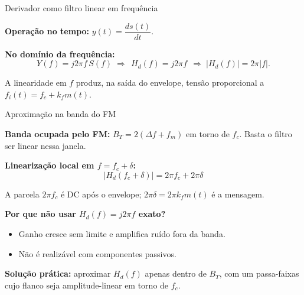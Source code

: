 
\begin{frame}{Derivador como filtro linear em frequência}

\small
\textbf{Operação no tempo:} $y(t) = \dfrac{ds(t)}{dt}$.

\pause
\textbf{No domínio da frequência:}
\[
Y(f) = j2\pi f\, S(f) \;\Longrightarrow\; \boxed{\,H_d(f) = j2\pi f\,} \;\Longrightarrow\; |H_d(f)| = 2\pi|f|.
\]

\pause
\begin{center}
\end{center}

A linearidade em $f$ produz, na saída do envelope, tensão proporcional a $f_i(t) = f_c + k_f m(t)$.

\end{frame}


\begin{frame}{Aproximação na banda do FM}

\textbf{Banda ocupada pelo FM:} $B_T = 2(\Delta f + f_m)$ em torno de $f_c$. Basta o filtro ser linear nessa janela.

\pause
\vspace{0.15cm}
\textbf{Linearização local em $f = f_c + \delta$:}
\[
|H_d(f_c + \delta)| = 2\pi f_c + 2\pi \delta
\]

A parcela $2\pi f_c$ é DC após o envelope; $2\pi\delta = 2\pi k_f m(t)$ é a mensagem.

\pause
\vspace{0.15cm}
\textbf{Por que não usar $H_d(f) = j2\pi f$ exato?}
\begin{itemize}\itemsep0pt
\item Ganho cresce sem limite e amplifica ruído fora da banda.
\item Não é realizável com componentes passivos.
\end{itemize}

\pause
\textbf{Solução prática:} aproximar $H_d(f)$ apenas dentro de $B_T$, com um passa-faixas cujo flanco seja amplitude-linear em torno de $f_c$.

\end{frame}

